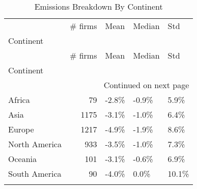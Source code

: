 \begin{longtable}{lrlll}
\toprule
 & \# firms & Mean & Median & Std \\
Continent &  &  &  &  \\
\midrule
\endfirsthead
\toprule
 & \# firms & Mean & Median & Std \\
Continent &  &  &  &  \\
\midrule
\endhead
\midrule
\multicolumn{5}{r}{Continued on next page} \\
\midrule
\endfoot
\bottomrule
\endlastfoot
Africa & 79 & -2.8\% & -0.9\% & 5.9\% \\
Asia & 1175 & -3.1\% & -1.0\% & 6.4\% \\
Europe & 1217 & -4.9\% & -1.9\% & 8.6\% \\
North America & 933 & -3.5\% & -1.0\% & 7.3\% \\
Oceania & 101 & -3.1\% & -0.6\% & 6.9\% \\
South America & 90 & -4.0\% & 0.0\% & 10.1\% \\
\caption{Emissions Breakdown By Continent}
\label{tab:emission-breakdown-by-continent}
\end{longtable}
